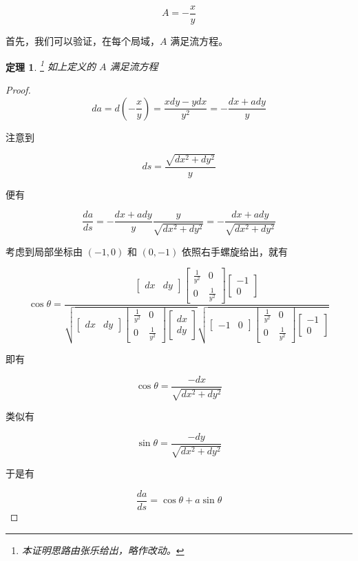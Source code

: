\documentclass[a4paper,12pt]{article}
\numberwithin{definition}{section}
\numberwithin{lemma}{section}
\numberwithin{proposition}{section}
\newtheorem{theorem}{定理}
\numberwithin{theorem}{section}
\numberwithin{grammar}{section}
\numberwithin{program}{section}
\numberwithin{convention}{section}
\numberwithin{corollary}{section}
\begin{document}
\begin{equation}
A = - \frac{x}{y}
\end{equation}

首先，我们可以验证，在每个局域，$A$ 满足流方程。

\begin{theorem}\footnote{本证明思路由张乐给出，略作改动。}
如上定义的 $A$ 满足流方程
\end{theorem}

\begin{proof}
$$
da = d(-\frac{x}{y}) = \frac{xdy - ydx}{y^2} = -\frac{dx + ady}{y}
$$

注意到

$$
ds = \frac{\sqrt{dx^2 + dy^2}}{y}
$$

便有

$$
\frac{da}{ds} = - \frac{dx + ady}{y} \frac{y}{\sqrt{dx^2 + dy^2}} = - \frac{dx + ady}{\sqrt{dx^2 + dy^2}}
$$

考虑到局部坐标由 $(-1, 0)$ 和 $(0, -1)$ 依照右手螺旋给出，就有

$$
\cos \theta = \frac{\begin{bmatrix} dx & dy \end{bmatrix} \begin{bmatrix} \frac{1}{y^2} & 0 \\ 0 & \frac{1}{y^2} \end{bmatrix} \begin{bmatrix} -1 \\ 0 \end{bmatrix}}{\sqrt{\begin{bmatrix} dx & dy \end{bmatrix} \begin{bmatrix} \frac{1}{y^2} & 0 \\ 0 & \frac{1}{y^2} \end{bmatrix} \begin{bmatrix} dx \\ dy \end{bmatrix}}\sqrt{\begin{bmatrix} -1 & 0 \end{bmatrix} \begin{bmatrix} \frac{1}{y^2} & 0 \\ 0 & \frac{1}{y^2} \end{bmatrix} \begin{bmatrix} -1 \\ 0 \end{bmatrix}}}
$$

即有

$$
\cos \theta = \frac{-dx}{\sqrt{dx^2 + dy^2}}
$$

类似有

$$
\sin \theta = \frac{-dy}{\sqrt{dx^2 + dy^2}}
$$

于是有

$$
\frac{da}{ds} = \cos \theta + a \sin \theta
$$

\end{proof}
\end{document}
